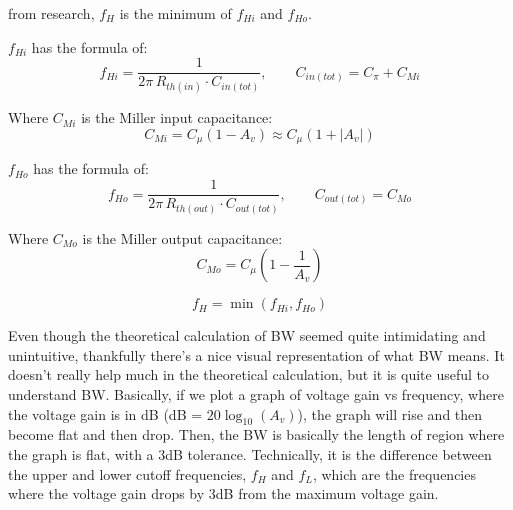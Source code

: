 \documentclass[11pt, a4paper]{article}
\begin{document}
from research, $f_H$ is the minimum of $f_{Hi}$ and $f_{Ho}$.

$f_{Hi}$ has the formula of:
\[
    f_{Hi} = \frac{1}{2\pi \, R_{th(in)} \cdot C_{in(tot)}}, \qquad C_{in(tot)} = C_\pi + C_{Mi}
\]

Where $C_{Mi}$ is the Miller input capacitance:
\[
    C_{Mi} = C_\mu (1 - A_v) \approx C_\mu (1 + |A_v|) 
\]

$f_{Ho}$ has the formula of:
\[
    f_{Ho} = \frac{1}{2\pi \, R_{th(out)} \cdot C_{out(tot)}}, \qquad C_{out(tot)} = C_{Mo}
\]

Where $C_{Mo}$ is the Miller output capacitance:
\[
    C_{Mo} = C_\mu (1 - \frac{1}{A_v})
\]

\[
    \boxed{f_H = \min(f_{Hi}, f_{Ho})}
\]

Even though the theoretical calculation of BW seemed quite intimidating and unintuitive, thankfully there's a nice visual representation of what BW means. It doesn't really help much in the theoretical calculation, but it is quite useful to understand BW. Basically, if we plot a graph of voltage gain vs frequency, where the voltage gain is in dB (dB = $20\log_{10}(A_v)$), the graph will rise and then become flat and then drop. Then, the BW is basically the length of region where the graph is flat, with a 3dB tolerance. Technically, it is the difference between the upper and lower cutoff frequencies, $f_H$ and $f_L$, which are the frequencies where the voltage gain drops by 3dB from the maximum voltage gain.
\end{document}
